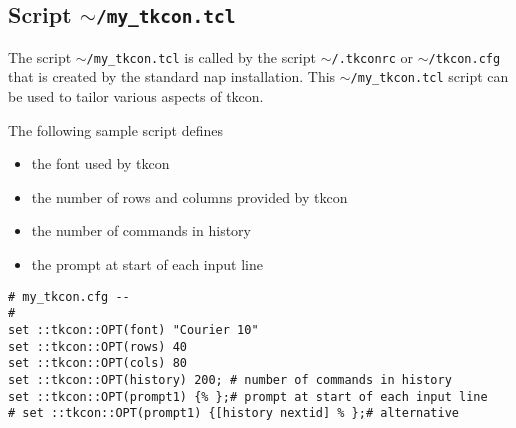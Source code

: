   \subsection{
    \label{my-tkcon}Script \texttt{$\sim$/my\_tkcon.tcl}
  }
The script 
  \texttt{$\sim$/my\_tkcon.tcl} is called by the script 
  \texttt{$\sim$/.tkconrc} or 
  \texttt{$\sim$/tkcon.cfg} that is created by the standard nap
  installation. This 
  \texttt{$\sim$/my\_tkcon.tcl} script can be used to tailor various
  aspects of tkcon.
  \par The following sample script defines
  \begin{itemize}
    \item the font used by tkcon
    \item the number of rows and columns provided by tkcon
    \item the number of commands in history
    \item the prompt at start of each input line
  \end{itemize}
  \begin{verbatim}
# my_tkcon.cfg --
#
set ::tkcon::OPT(font) "Courier 10"
set ::tkcon::OPT(rows) 40
set ::tkcon::OPT(cols) 80
set ::tkcon::OPT(history) 200; # number of commands in history
set ::tkcon::OPT(prompt1) {% };# prompt at start of each input line
# set ::tkcon::OPT(prompt1) {[history nextid] % };# alternative
\end{verbatim}


